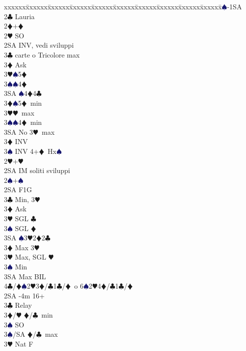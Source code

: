 \documentclass[a4paper,italian]{article}
\newcommand{\BC}{\textcolor{OliveGreen}{$\clubsuit$}}
\newcommand{\BD}{\textcolor{RedOrange}{$\vardiamondsuit$}}
\newcommand{\BH}{\textcolor{Red2}{$\varheartsuit${}}}
\newcommand{\BS}{\textcolor{MidnightBlue}{$\spadesuit${}}}
\newenvironment{bidtable}
{\begin{tabbing}

    xxxxxx\=xxxxxx\=xxxxxx\=xxxxxx\=xxxxxx\=xxxxxx\=xxxxxx\=xxxxxx\=xxxxxx\=xxxxxx\=\kill}
{\end{tabbing} }%
\begin{document}
\begin{multicols}{2}
    \begin{bidtable}
        1\BS-1SA\+\\
        2\BC \> Lauria\\
        2\BD {}+\BD \+\\
        2\BH \> SO\\
        2SA \> INV, vedi sviluppi\+\\
        3\BC {} carte o Tricolore max\+\\
        3\BD \> Ask\+\\
        3\BH {}\BS 5\BD \\
        3\BS {}\BS 4\BD \\
        3SA \BS 4\BD 4\BC \-\-\\
        3\BD {}\BS 5\BD\ min\\
        3\BH {}\BH\ max\\
        3\BS {}\BS 4\BD\ min\\
        3SA \> No 3\BH\ max\-\\
        3\BD \> INV\\
        3\BS \> INV 4+\BD\ Hx\BS \-\\
        2\BH {}+\BH \+\\
        2SA \> IM soliti sviluppi\-\\
        2\BS {}+\BS \+\\
        2SA \> F1G\+\\
        3\BC \> Min, 3\BH \+\\
        3\BD \> Ask\+\\
        3\BH \> SGL \BC \\
        3\BS \> SGL \BD \\
        3SA \BS3\BH2\BD2\BC \-\-\\
        3\BD \> Max 3\BH \\
        3\BH \> Max, SGL \BH\\
        3\BS \> Min\\
        3SA \> Max BIL\\
        4\BC/\BD {}\BS2\BH3\BD/\BC1\BC/\BD\ o 6\BS2\BH4\BD/\BC1\BC/\BD\-\-\\
        2SA -4m 16+\+\\
        3\BC \> Relay\+\\
        3\BD/\BH \> \BD /\BC\ min\+\\
        3\BS \> SO\-\\
        3\BS/SA \> \BD /\BC\ max\-\\
        3\BH \> Nat F\\

\end{bidtable}
\end{multicols}
\end{document}

